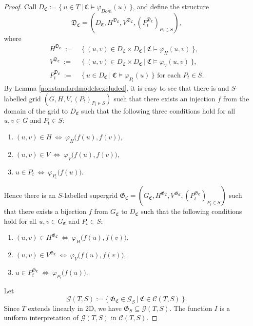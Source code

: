 \documentclass{LMCS}
\theoremstyle{plain}
\newcommand{\mf}{\mathfrak}
\newcommand{\mi}{\mathit}
\begin{document}
\begin{proof}
%
Call $D_\mf{C} := \{\ u\in T\ |\ \mf{C}\models\varphi_{\mi{Dom}}(u)\ \}$, and 
%
define the
%
structure
%
%
%
$$\mf{D}_\mf{C} = (D_\mf{C},H^{\mf{D}_\mf{C}},V^{\mf{D}_\mf{C}},(P_t^{\mf{D}_\mf{C}})_{P_t\in S}),$$
%
%
%
where 
%
%
%
\begin{align*}
%
H^{\mf{D}_\mf{C}}\ :=&\ \{\ (u,v)\in D_\mf{C}\times D_\mf{C}\ |\ \mathfrak{C}\models\varphi_H(u,v)\ \}, \\
%
V^{\mf{D}_\mf{C}}\ :=&\ \{\ (u,v)\in D_\mf{C}\times D_\mf{C}\ |\ \mathfrak{C}\models\varphi_V(u,v)\ \},\\
%
P_t^{\mf{D}_\mf{C}}\ :=&\ \{\ u\in D_\mf{C}\ |\ \mathfrak{C}\models\varphi_{P_t}(u)\ \}\text{ for each }P_t\in S.
%
\end{align*}
%
%
%
By Lemma \ref{nonstandardmodelsexcluded}, it is easy to see that there
%
is and $S$-labelled grid
%
$(G,H,V,(P_t)_{P_t\in S})$ such that there
%
exists an injection $f$ from the domain of the grid to $D_{\mf{C}}$ such that 
%
the following three conditions hold for all $u,v\in G$ and $P_t\in S$:
%
%
%
\begin{enumerate}
%
\item
$(u,v)\in H\ \Leftrightarrow\ \varphi_{H}\bigl(f(u),f(v)\bigr)$,
%
\item
$(u,v)\in V\ 
\Leftrightarrow\ \varphi_{V}\bigl(f(u),f(v)\bigr)$,
%
\item
$u\in P_{t}\ 
\Leftrightarrow\ \varphi_{P_t}\bigl( f(u)\bigr)$.
%
\end{enumerate}
%
%
%
Hence there is an $S$-labelled supergrid $\mf{G}_\mf{C}=(G_\mf{C},H^{\mf{G}_\mf{C}},V^{\mf{G}_\mf{C}},(P_t^{\mf{G}_\mf{C}})_{P_t\in S})$ such that
%
there exists a bijection $f$
%
from $G_\mf{C}$ to $D_\mf{C}$ such that
%
the following conditions hold for all $u,v\in G_{\mf{C}}$ and $P_t\in S$:
%
%
%
\begin{enumerate}
%
\item
$(u,v)\in H^{\mf{G}_\mf{C}}\ \Leftrightarrow\ \varphi_{H}\bigl(f(u),f(v)\bigr)$,
%
\item
$(u,v)\in V^{\mf{G}_\mf{C}}\ 
\Leftrightarrow\ \varphi_{V}\bigl(f(u),f(v)\bigr)$,
%
\item
$u\in P^{\mf{G}_\mf{C}}_{t}\ 
\Leftrightarrow\ \varphi_{P_t}\bigl( f(u)\bigr)$.
%
\end{enumerate}
%
%
%
%
%
Let 
%
%
%
$$\mathcal{G}(T,S):=\{\ \mf{G}_{\mf{C}}\in\mathcal{G}_S
%
\ |\ \mf{C}\in\mathcal{C}(T,S)\ \}.$$
%
%
%
Since $T$ extends linearly in $\mathrm{2D}$, we have $\mf{G}_S\subseteq\mathcal{G}(T,S)$.
%
The function $I$ is a uniform interpretation of $\mathcal{G}(T,S)$ in $\mathcal{C}(T,S)$.
%
%
% 
\end{proof}
\end{document}
